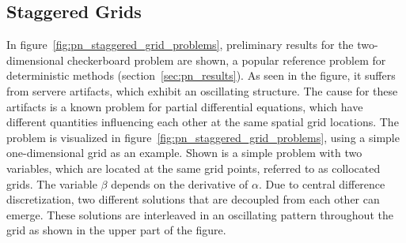 \subsection{Staggered Grids}
\label{sec:pn_staggered}

In figure~\ref{fig:pn_staggered_grid_problems}, preliminary results for the two-dimensional checkerboard problem are shown, a popular reference problem for deterministic methods (section~\ref{sec:pn_results}). As seen in the figure, it suffers from servere artifacts, which exhibit an oscillating structure. The cause for these artifacts is a known problem for partial differential equations, which have different quantities influencing each other at the same spatial grid locations. The problem is visualized in figure~\ref{fig:pn_staggered_grid_problems}, using a simple one-dimensional grid as an example. Shown is a simple problem with two variables, which are located at the same grid points, referred to as collocated grids. The variable $\beta$ depends on the derivative of $\alpha$. Due to central difference discretization, two different solutions that are decoupled from each other can emerge. These solutions are interleaved in an oscillating pattern throughout the grid as shown in the upper part of the figure.

